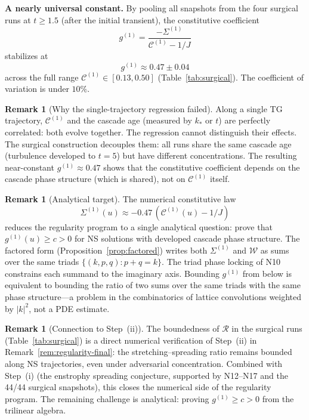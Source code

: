 \documentclass[11pt]{article}
\theoremstyle{definition}
\newtheorem{remark}[theorem]{Remark}
\newcommand{\cC}{\mathcal{C}}
\begin{document}
\medskip\noindent\textbf{A nearly universal
constant.}
By pooling all snapshots from the four surgical runs
at $t\geq 1.5$ (after the initial transient), the
constitutive coefficient
\begin{equation}\label{eq:g1-value}
g^{(1)} = \frac{-\Sigma^{(1)}}{\cC^{(1)}-1/J}
\end{equation}
stabilizes at
\begin{equation}\label{eq:g1-numerical}
g^{(1)} \approx 0.47 \pm 0.04
\end{equation}
across the full range
$\cC^{(1)}\in[0.13, 0.50]$
(Table~\ref{tab:surgical}).  The coefficient of
variation is under $10\%$.

\begin{remark}[Why the single-trajectory regression
failed]
Along a single TG trajectory, $\cC^{(1)}$ and the
cascade age (measured by $k_*$ or $t$) are perfectly
correlated: both evolve together.  The regression
cannot distinguish their effects.  The surgical
construction decouples them: all runs share the same
cascade age (turbulence developed to $t=5$) but have
different concentrations.  The resulting near-constant
$g^{(1)}\approx 0.47$ shows that the constitutive
coefficient depends on the cascade phase structure
(which is shared), not on $\cC^{(1)}$ itself.
\end{remark}

\begin{remark}[Analytical target]
\label{rem:analytical-target}
The numerical constitutive law
\begin{equation}\label{eq:constitutive-target}
\Sigma^{(1)}(u) \approx -0.47\,
(\cC^{(1)}(u)-1/J)
\end{equation}
reduces the regularity program to a single
analytical question: prove that
$g^{(1)}(u) \geq c > 0$ for NS solutions with
developed cascade phase structure.  The factored
form (Proposition~\ref{prop:factored}) writes both
$\Sigma^{(1)}$ and $\mathcal{W}$ as sums over the
same triads $\{(k,p,q): p+q=k\}$.  The triad phase
locking of N10 constrains each summand to the
imaginary axis.  Bounding $g^{(1)}$ from below is
equivalent to bounding the ratio of two sums over
the same triads with the same phase structure---a
problem in the combinatorics of lattice convolutions
weighted by $|k|^2$, not a PDE estimate.
\end{remark}

\begin{remark}[Connection to Step~(ii)]
\label{rem:step-ii}
The boundedness of $\mathcal{R}$ in the surgical
runs (Table~\ref{tab:surgical}) is a direct
numerical verification of Step~(ii) in
Remark~\ref{rem:regularity-final}: the
stretching--spreading ratio remains bounded along
NS trajectories, even under adversarial
concentration.  Combined with Step~(i) (the
enstrophy spreading conjecture, supported by
N12--N17 and the 44/44 surgical snapshots), this
closes the numerical side of the regularity program.
The remaining challenge is analytical: proving
$g^{(1)}\geq c > 0$ from the trilinear algebra.
\end{remark}
\end{document}

